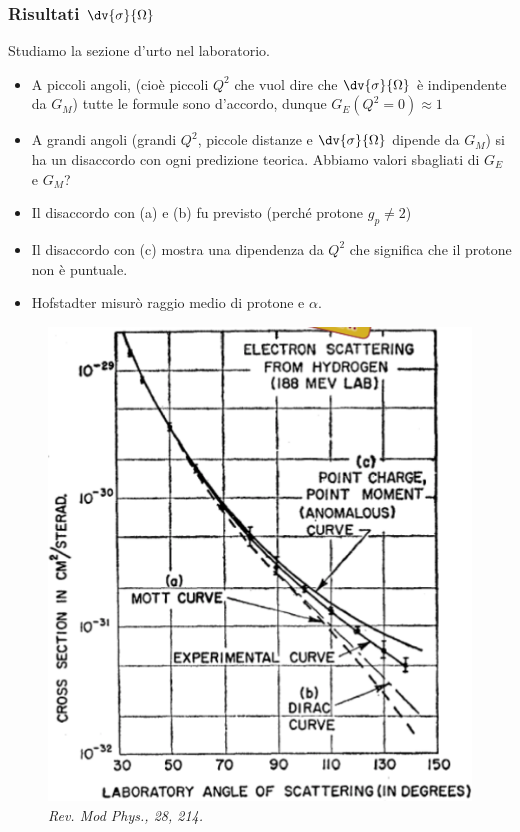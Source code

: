 \subsubsection{Risultati $\dv{\sigma}{\Omega}$}
Studiamo la sezione d'urto nel laboratorio.\newline
\noindent
\begin{minipage}[t]{0.48\textwidth}
    \begin{itemize}
        \item A piccoli angoli, (cioè piccoli $Q^2$ che vuol dire che $\dv{\sigma}{\Omega}$ è indipendente da $G_M$) tutte le formule sono d'accordo, dunque $G_E(Q^2=0)\approx1$
        \item A grandi angoli (grandi $Q^2$, piccole distanze e $\dv{\sigma}{\Omega}$ dipende da $G_M$) si ha un disaccordo con ogni predizione teorica. Abbiamo valori sbagliati di $G_E$ e $G_M$?
        \item Il disaccordo con (a) e (b) fu previsto (perché protone $g_p\neq2$)
        \item Il disaccordo con (c) mostra una dipendenza da $Q^2$ che significa che il protone non è puntuale.
        \item Hofstadter misurò raggio medio di protone e $\alpha$.  
    \end{itemize}
\end{minipage}
\hfill
\begin{minipage}[t]{0.48\textwidth}
    \begin{figure}[H]
        \centering
        \includegraphics[width=\textwidth]{immagini/fig_proton_structure_result.png}
        \caption{\textit{Rev. Mod Phys., 28, 214.}}
    \end{figure}
\end{minipage}
